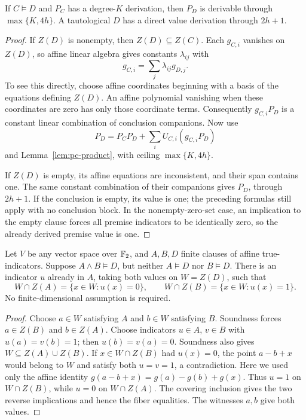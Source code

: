 \begin{lemma}\label{lem:clause-weakening}
If \(C\models D\) and \(P_C\) has a degree-\(K\) derivation, then
\(P_D\) is derivable through \(\max\{K,4h\}\).
A tautological \(D\) has a direct value derivation through \(2h+1\).
\end{lemma}
\begin{proof}
If \(Z(D)\) is nonempty, then \(Z(D)\subseteq Z(C)\).
Each \(g_{C,i}\) vanishes on \(Z(D)\), so affine linear algebra gives
constants \(\lambda_{ij}\) with
\[
 g_{C,i}=\sum_j\lambda_{ij}g_{D,j}.
\]
To see this directly, choose affine coordinates beginning with a basis
of the equations defining \(Z(D)\). An affine polynomial vanishing when
these coordinates are zero has only those coordinate terms.
Consequently \(g_{C,i}P_D\) is a constant linear combination of
conclusion companions. Now use
\[
 P_D=P_CP_D+\sum_iU_{C,i}(g_{C,i}P_D)
\]
and Lemma~\ref{lem:pc-product}, with ceiling \(\max\{K,4h\}\).

If \(Z(D)\) is empty, its affine equations are inconsistent, and their
span contains one. The same constant combination of their companions
gives \(P_D\), through \(2h+1\).
If the conclusion is empty, its value is one; the preceding formulas
still apply with no conclusion block. In the nonempty-zero-set case,
an implication to the empty clause forces all premise indicators to
be identically zero, so the already derived premise value is one.
\end{proof}


\begin{lemma}\label{lem:binary-separator}
Let \(V\) be any vector space over \(\mathbb F_2\), and \(A,B,D\) finite clauses
of affine true-indicators. Suppose \(A\wedge B\models D\), but neither
\(A\models D\) nor \(B\models D\). There is an indicator \(u\) already
in \(A\), taking both values on \(W=Z(D)\), such that
\[
 W\cap Z(A)=\{x\in W:u(x)=0\},\qquad
 W\cap Z(B)=\{x\in W:u(x)=1\}.
\]
No finite-dimensional assumption is required.
\end{lemma}
\begin{proof}
Choose \(a\in W\) satisfying \(A\) and \(b\in W\) satisfying \(B\).
Soundness forces \(a\in Z(B)\) and \(b\in Z(A)\). Choose indicators
\(u\in A\), \(v\in B\) with \(u(a)=v(b)=1\); then
\(u(b)=v(a)=0\). Soundness also gives \(W\subseteq Z(A)\cup Z(B)\).
If \(x\in W\cap Z(B)\) had \(u(x)=0\), the point \(a-b+x\) would
belong to \(W\) and satisfy both \(u=v=1\), a contradiction. Here we
used only the affine identity \(g(a-b+x)=g(a)-g(b)+g(x)\).
Thus \(u=1\) on \(W\cap Z(B)\), while \(u=0\) on \(W\cap Z(A)\).
The covering inclusion gives the two reverse implications and hence the
fiber equalities. The witnesses \(a,b\) give both values.
\end{proof}

